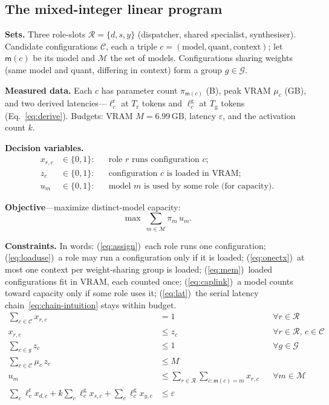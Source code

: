 \documentclass[11pt]{article}
\newcommand{\eps}{\varepsilon}
\begin{document}
\subsection{The mixed-integer linear program}
\textbf{Sets.} Three role-slots $\mathcal{R}=\{d,s,y\}$ (dispatcher, shared
specialist, synthesiser). Candidate configurations $\mathcal{C}$, each a triple
$c=(\text{model},\text{quant},\text{context})$; let $\textsf{m}(c)$ be its model
and $\mathcal{M}$ the set of models. Configurations sharing weights (same model
and quant, differing in context) form a group $g\in\mathcal{G}$.

\textbf{Measured data.} Each $c$ has parameter count $\pi_{\textsf{m}(c)}$ (B),
peak VRAM $\mu_c$ (GB), and two derived latencies---$\ell^{\text{r}}_c$ at
$T_{\text{r}}$ tokens and $\ell^{\text{g}}_c$ at $T_{\text{g}}$ tokens
(Eq.~\ref{eq:derive}). Budgets: VRAM $M=6.99$\,GB, latency $\eps$, and the
activation count $k$.

\textbf{Decision variables.}
\begin{align}
x_{r,c}&\in\{0,1\}: && \text{role $r$ runs configuration $c$;}\\
z_{c}&\in\{0,1\}: && \text{configuration $c$ is loaded in VRAM;}\\
u_{m}&\in\{0,1\}: && \text{model $m$ is used by some role (for capacity).}
\end{align}

\textbf{Objective}---maximize distinct-model capacity:
\begin{equation}
\max\ \sum_{m\in\mathcal{M}} \pi_m\,u_{m}.
\label{eq:obj}
\end{equation}

\textbf{Constraints.} In words: (\ref{eq:assign})~each role runs one
configuration; (\ref{eq:loaduse})~a role may run a configuration only if it is
loaded; (\ref{eq:onectx})~at most one context per weight-sharing group is loaded;
(\ref{eq:mem})~loaded configurations fit in VRAM, each counted once;
(\ref{eq:caplink})~a model counts toward capacity only if some role uses it;
(\ref{eq:lat})~the serial latency chain~\eqref{eq:chain-intuition} stays
within budget.
\begin{align}
\sum_{c\in\mathcal{C}} x_{r,c} &= 1 && \forall r\in\mathcal{R}
\label{eq:assign}\\
x_{r,c} &\le z_{c} && \forall r\in\mathcal{R},\,c\in\mathcal{C}
\label{eq:loaduse}\\
\sum_{c\in g} z_{c} &\le 1 && \forall g\in\mathcal{G}
\label{eq:onectx}\\
\sum_{c\in\mathcal{C}} \mu_c\,z_{c} &\le M
\label{eq:mem}\\
u_{m} &\le \!\!\sum_{r\in\mathcal{R}}\sum_{c:\textsf{m}(c)=m}\!\! x_{r,c}
&& \forall m\in\mathcal{M}
\label{eq:caplink}\\[-1pt]
\sum_{c} \ell^{\text{r}}_c x_{d,c} + k\!\sum_{c} \ell^{\text{g}}_c x_{s,c}
+ \sum_{c} \ell^{\text{g}}_c x_{y,c} &\le \eps
\label{eq:lat}
\end{align}
\end{document}
